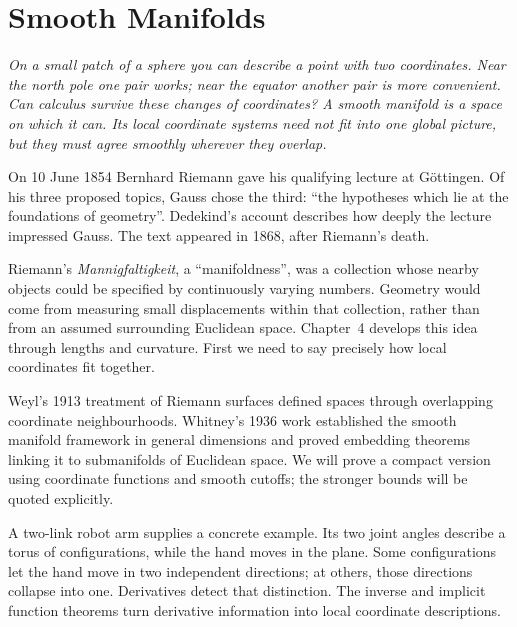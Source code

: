 \chapter{Smooth Manifolds}

\begin{center}\itshape
On a small patch of a sphere you can describe a point with two coordinates. Near the north pole one pair works; near the equator another pair is more convenient. Can calculus survive these changes of coordinates? A smooth manifold is a space on which it can. Its local coordinate systems need not fit into one global picture, but they must agree smoothly wherever they overlap.
\end{center}

On 10 June 1854 Bernhard Riemann gave his qualifying lecture at G\"ottingen. Of his three proposed topics, Gauss chose the third: ``the hypotheses which lie at the foundations of geometry''. Dedekind's account describes how deeply the lecture impressed Gauss. The text appeared in 1868, after Riemann's death.

Riemann's \emph{Mannigfaltigkeit}, a ``manifoldness'', was a collection whose nearby objects could be specified by continuously varying numbers. Geometry would come from measuring small displacements within that collection, rather than from an assumed surrounding Euclidean space. Chapter~4 develops this idea through lengths and curvature. First we need to say precisely how local coordinates fit together.


Weyl's 1913 treatment of Riemann surfaces defined spaces through overlapping coordinate neighbourhoods. Whitney's 1936 work established the smooth manifold framework in general dimensions and proved embedding theorems linking it to submanifolds of Euclidean space. We will prove a compact version using coordinate functions and smooth cutoffs; the stronger bounds will be quoted explicitly.

A two-link robot arm supplies a concrete example. Its two joint angles describe a torus of configurations, while the hand moves in the plane. Some configurations let the hand move in two independent directions; at others, those directions collapse into one. Derivatives detect that distinction. The inverse and implicit function theorems turn derivative information into local coordinate descriptions.

